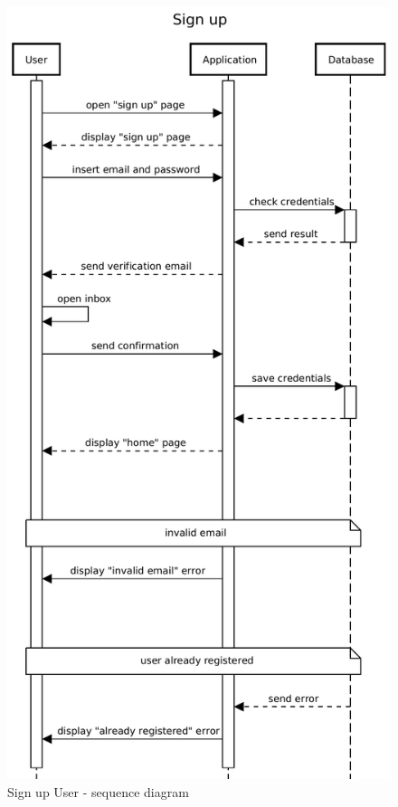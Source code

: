 \begin{figure}[H]
    \centering
    \includegraphics[scale=0.5]{Images/Sequence diagrams/User - sign up.pdf}
    \caption{Sign up User - sequence diagram}
    \label{fig:my_label}
\end{figure}

